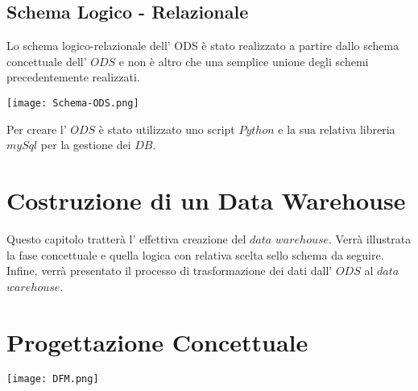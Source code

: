 \documentclass[12pt, a4paper]{scrartcl}
\begin{document}
\subsection*{Schema Logico - Relazionale}
Lo schema logico-relazionale dell' ODS è stato realizzato a partire dallo schema concettuale dell' $ODS$ e non è altro che una semplice unione degli schemi precedentemente realizzati.
\begin{center}
\texttt{[image: Schema-ODS.png]}
\end{center}

Per creare l' $ODS$ è stato utilizzato uno script $Python$ e la sua relativa libreria $mySql$ per la gestione dei $DB$.
\section*{Costruzione di un Data Warehouse}
Questo capitolo tratterà l' effettiva creazione del $data$ $warehouse$. Verrà illustrata la fase concettuale e quella logica con relativa scelta sello schema da seguire. Infine, verrà presentato il processo di trasformazione dei dati dall' $ODS$ al $data$ $warehouse$.
\section*{Progettazione Concettuale}
\begin{center}
\texttt{[image: DFM.png]}
\end{center}
\end{document}
